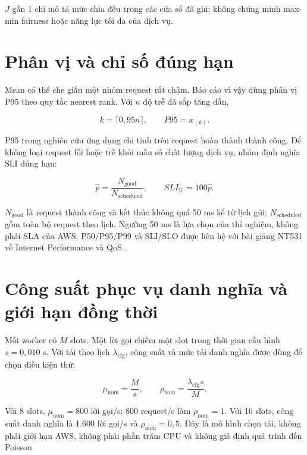 $J$ gần 1 chỉ mô tả mức chia đều trong các cửa sổ đã ghi; không chứng minh
max-min fairness hoặc năng lực tối đa của dịch vụ.

\section{Phân vị và chỉ số đúng hạn}

Mean có thể che giấu một nhóm request rất chậm. Báo cáo vì vậy dùng phân vị
P95 theo quy tắc nearest rank. Với $n$ độ trễ đã sắp tăng dần,

\begin{equation}
k=\lceil0{,}95n\rceil,\qquad P95=x_{(k)}.
\end{equation}

P95 trong nghiên cứu ứng dụng chỉ tính trên request hoàn thành thành công.
Để không loại request lỗi hoặc trễ khỏi mẫu số chất lượng dịch vụ, nhóm định
nghĩa SLI đúng hạn:

\begin{equation}
\widehat p=\frac{N_{\mathrm{good}}}{N_{\mathrm{scheduled}}},
\qquad SLI_{\%}=100\widehat p.
\end{equation}

$N_{\mathrm{good}}$ là request thành công và kết thúc không quá 50 ms kể từ
lịch gửi; $N_{\mathrm{scheduled}}$ gồm toàn bộ request theo lịch. Ngưỡng 50 ms
là lựa chọn của thí nghiệm, không phải SLA của AWS. P50/P95/P99 và SLI/SLO được
liên hệ với bài giảng NT531 về Internet Performance và QoS
\cite{nt531-qos-lecture}.

\section{Công suất phục vụ danh nghĩa và giới hạn đồng thời}

Mỗi worker có $M$ slots. Một lời gọi chiếm một slot trong thời gian cấu hình
$s=0{,}010$ s. Với tải theo lịch $\lambda_{\mathrm{cfg}}$, công suất và mức tải
danh nghĩa được dùng để chọn điều kiện thử:

\begin{equation}
\mu_{\mathrm{nom}}=\frac{M}{s},\qquad
\rho_{\mathrm{nom}}=\frac{\lambda_{\mathrm{cfg}}s}{M}.
\end{equation}

Với 8 slots, $\mu_{\mathrm{nom}}=800$ lời gọi/s; 800 request/s làm
$\rho_{\mathrm{nom}}=1$. Với 16 slots, công suất danh nghĩa là 1.600 lời gọi/s
và $\rho_{\mathrm{nom}}=0{,}5$. Đây là mô hình chọn tải, không phải giới hạn AWS,
không phải phần trăm CPU và không giả định quá trình đến Poisson.

